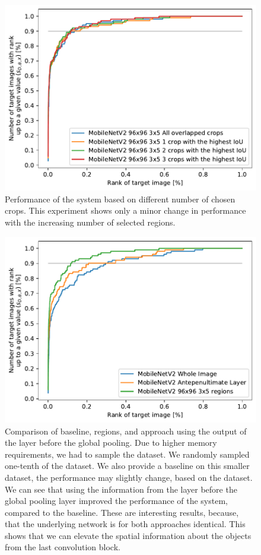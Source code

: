 \begin{figure}
\centering
\includegraphics[width=0.8\linewidth]{graphs/5c4a781f8e6f3eac93db2083bde3963c06582a92a8141411bf29e41251a98e75.pdf}
\caption[Performance of the system based on different number of chosen crops]{Performance of the system based on different number of chosen crops. This experiment shows only a minor change in performance with the increasing number of selected regions.}
\label{fig:crop_limitation}
\end{figure}

\begin{figure}
    \centering
    \includegraphics[width=0.8\linewidth]{graphs/adaf8d435bb40406f9ce40654ec396e04453ab76cf0776d2a87d385055d5424f.pdf}
    \caption[Comparison of baseline, regions, and approach using the output of the layer before the global pooling]{Comparison of baseline, regions, and approach using the output of the layer before the global pooling. Due to higher memory requirements, we had to sample the dataset. We randomly sampled one-tenth of the dataset. We also provide a baseline on this smaller dataset, the performance may slightly change, based on the dataset. We can see that using the information from the layer before the global pooling layer improved the performance of the system, compared to the baseline. These are interesting results, because, that the underlying network is for both approaches identical. This shows that we can elevate the spatial information about the objects from the last convolution block.}
    \label{fig:antepenultimate}
\end{figure}

